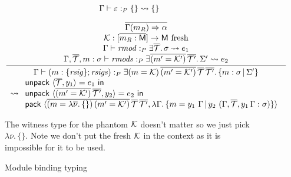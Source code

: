 \documentclass{article}
\begin{document}
\begin{figure}[H]

\[
\Gamma \vdash \varepsilon :_P \{ \} \leadsto{}  \{\}
\]

\[
\frac{
\begin{array}{c}
\overline{\Gamma(m_R) \Rightarrow \alpha} \\
\mathcal{K} : [\overline{m_R : \mathsf{M}}] \rightarrow \mathsf{M}~\mbox{fresh}\\
\Gamma \vdash \mathit{rmod} :_P \exists \overline{\mathcal{T}}.\, \sigma \leadsto{} e_1 \\
\Gamma, \overline{\mathcal{T}}, m : \sigma \vdash \mathit{rmods} :_P \exists \overline{(m' = \mathcal{K}')}\, \overline{\mathcal{T}'}.\, \Sigma' \leadsto{} e_2 \\
\end{array}
}{
\begin{array}{c}
\Gamma \vdash (m : \{ \mathit{rsig} \}; \mathit{rsigs}) :_P \exists (m = \mathcal{K})\, \overline{(m' = \mathcal{K}')}\, \overline{\mathcal{T}}\, \overline{\mathcal{T}'}.\, \{ m : \sigma \,|\, \Sigma' \} \\
\leadsto{} 
\begin{array}{l}
\textsf{unpack}~\langle \overline{\mathcal{T}}, y_1 \rangle = e_1~\textsf{in} \\
\textsf{unpack}~\langle \overline{(m' = \mathcal{K}')}\, \overline{\mathcal{T}'}, y_2 \rangle = e_2~\textsf{in} \\
\textsf{pack}~\langle \overline{(m = \lambda \overline{\nu}.\, \{\})\, (m' = \mathcal{K}')}\, \overline{\mathcal{T}}\, \overline{\mathcal{T}'}, \lambda \Gamma.\, \{ m = y_1~\Gamma \,|\, y_2~(\Gamma, \overline{\mathcal{T}}, y_1\,\Gamma : \sigma) \} \rangle
\end{array}

\end{array}
}
\]

The witness type for the phantom $\mathcal{K}$ doesn't matter so we just pick $\lambda \overline{\nu}.\, \{\}$.  Note we don't put the fresh $\mathcal{K}$ in the context as it is impossible for it to be used.

\caption{Module binding typing}
\end{figure}
\end{document}
